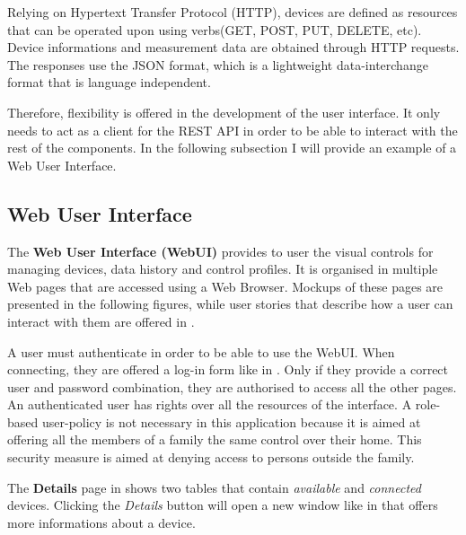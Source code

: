 Relying on Hypertext Transfer Protocol (HTTP), devices are defined as resources that can be operated upon using verbs(GET, POST, PUT, DELETE, etc). Device informations and measurement data are obtained through HTTP requests. The responses use the JSON format, which is a lightweight data-interchange format that is language independent. 

Therefore, flexibility is offered in the development of the user interface. It only needs to act as a client for the REST API in order to be able to interact with the rest of the components. In the following subsection I will provide an example of a Web User Interface.

\subsection{Web User Interface}
\label{sub-sec:web-ui}

The \textbf{Web User Interface (WebUI)} provides to user the visual controls for managing devices, data history and control profiles. It is organised in multiple Web pages that are accessed using a Web Browser. Mockups of these pages are presented in the following figures, while user stories that describe how a user can interact with them are offered in .


A user must authenticate in order to be able to use the WebUI. When connecting, they are offered a log-in form like in . Only if they provide a correct user and password combination, they are authorised to access all the other pages. An authenticated user has rights over all the resources of the interface. A role-based user-policy is not necessary in this application because it is aimed at offering all the members of a family the same control over their home. This security measure is aimed at denying access to persons outside the family.


The \textbf{Details} page in  shows two tables that contain \textit{available} and \textit{connected} devices. Clicking the \textit{Details} button will open a new window like in  that offers more informations about a device.

